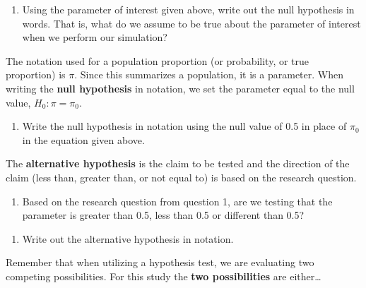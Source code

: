 \documentclass[
]{report}
\providecommand{\tightlist}{%
  \setlength{\itemsep}{0pt}\setlength{\parskip}{0pt}}
\begin{document}
\begin{enumerate}
\def\labelenumi{\arabic{enumi}.}
\setcounter{enumi}{5}
\tightlist
\item
  Using the parameter of interest given above, write out the null hypothesis in words. That is, what do we assume to be true about the parameter of interest when we perform our simulation?
  \vspace{0.8in}
\end{enumerate}

The notation used for a population proportion (or probability, or true proportion) is \(\pi\). Since this summarizes a population, it is a parameter. When writing the \textbf{null hypothesis} in notation, we set the parameter equal to the null value, \(H_0: \pi = \pi_0\).

\begin{enumerate}
\def\labelenumi{\arabic{enumi}.}
\setcounter{enumi}{6}
\tightlist
\item
  Write the null hypothesis in notation using the null value of 0.5 in place of \(\pi_0\) in the equation given above.
\end{enumerate}

\vspace{0.5in}

The \textbf{alternative hypothesis} is the claim to be tested and the direction of the claim (less than, greater than, or not equal to) is based on the research question.

\begin{enumerate}
\def\labelenumi{\arabic{enumi}.}
\setcounter{enumi}{7}
\tightlist
\item
  Based on the research question from question 1, are we testing that the parameter is greater than 0.5, less than 0.5 or different than 0.5?
\end{enumerate}

\vspace{0.2in}

\begin{enumerate}
\def\labelenumi{\arabic{enumi}.}
\setcounter{enumi}{8}
\tightlist
\item
  Write out the alternative hypothesis in notation.
\end{enumerate}

\vspace{0.5in}

Remember that when utilizing a hypothesis test, we are evaluating two competing possibilities. For this study the \textbf{two possibilities} are either\ldots{}
\end{document}
